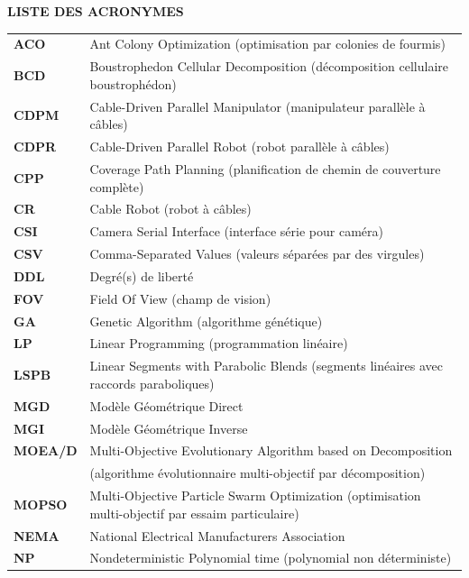 \clearpage
{}
{}
\thispagestyle{plain}
\setlength{\parskip}{0pt}
\setlength{\baselineskip}{12pt}

\begin{center}
{\Large\bfseries LISTE DES ACRONYMES}
\end{center}
\vspace{0.4em}

{\footnotesize
\renewcommand{\arraystretch}{1.05}
\noindent
\begin{tabular}{@{}>{\bfseries}l@{\ :\ }p{}@{}}
ACO & Ant Colony Optimization (optimisation par colonies de fourmis) \\
BCD & Boustrophedon Cellular Decomposition (décomposition cellulaire boustrophédon) \\
CDPM & Cable-Driven Parallel Manipulator (manipulateur parallèle à câbles) \\
CDPR & Cable-Driven Parallel Robot (robot parallèle à câbles) \\
CPP & Coverage Path Planning (planification de chemin de couverture complète) \\
CR & Cable Robot (robot à câbles) \\
CSI & Camera Serial Interface (interface série pour caméra) \\
CSV & Comma-Separated Values (valeurs séparées par des virgules) \\
DDL & Degré(s) de liberté \\
FOV & Field Of View (champ de vision) \\
GA & Genetic Algorithm (algorithme génétique) \\
LP & Linear Programming (programmation linéaire) \\
LSPB & Linear Segments with Parabolic Blends (segments linéaires avec raccords paraboliques) \\
MGD & Modèle Géométrique Direct \\
MGI & Modèle Géométrique Inverse \\
MOEA/D & Multi-Objective Evolutionary Algorithm based on Decomposition \\
 & (algorithme évolutionnaire multi-objectif par décomposition) \\
MOPSO & Multi-Objective Particle Swarm Optimization (optimisation multi-objectif par essaim particulaire) \\
NEMA & National Electrical Manufacturers Association \\
NP & Nondeterministic Polynomial time (polynomial non déterministe) \\

\end{tabular}}
